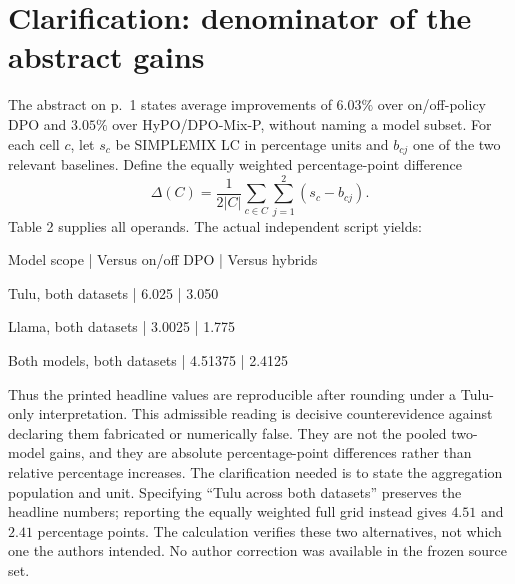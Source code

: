\documentclass[10pt]{article}
\begin{document}
\section*{Clarification: denominator of the abstract gains}
The abstract on p. 1 states average improvements of \(6.03\%\) over on/off-policy DPO and \(3.05\%\) over HyPO/DPO-Mix-P, without naming a model subset. For each cell \(c\), let \(s_c\) be SIMPLEMIX LC in percentage units and \(b_{cj}\) one of the two relevant baselines. Define the equally weighted percentage-point difference \[\Delta(C)=\frac{1}{2|C|}\sum_{c\in C}\sum_{j=1}^2(s_c-b_{cj}).\] Table 2 supplies all operands. The actual independent script yields:\par
Model scope | Versus on/off DPO | Versus hybrids\par
Tulu, both datasets | 6.025 | 3.050\par
Llama, both datasets | 3.0025 | 1.775\par
Both models, both datasets | 4.51375 | 2.4125\par
Thus the printed headline values are reproducible after rounding under a Tulu-only interpretation. This admissible reading is decisive counterevidence against declaring them fabricated or numerically false. They are not the pooled two-model gains, and they are absolute percentage-point differences rather than relative percentage increases. The clarification needed is to state the aggregation population and unit. Specifying “Tulu across both datasets” preserves the headline numbers; reporting the equally weighted full grid instead gives \(4.51\) and \(2.41\) percentage points. The calculation verifies these two alternatives, not which one the authors intended. No author correction was available in the frozen source set.\par
\end{document}
